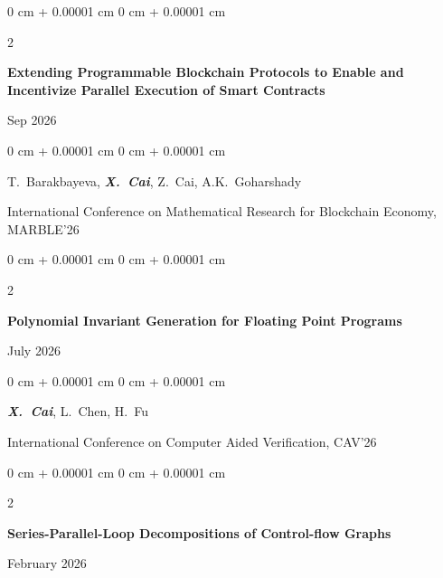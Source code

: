 \documentclass[10pt, letterpaper]{article}
\newenvironment{onecolentry}{
    \begin{adjustwidth}{
        0 cm + 0.00001 cm
    }{
        0 cm + 0.00001 cm
    }
}{
    \end{adjustwidth}
} %
\newenvironment{twocolentry}[2][]{
    \onecolentry
    \def\secondColumn{#2}
    \setcolumnwidth{\fill, 4.5 cm}
    \begin{paracol}{2}
}{
    \switchcolumn \raggedleft \secondColumn
    \end{paracol}
    \endonecolentry
} %
\begin{document}
        \begin{samepage}
                \vspace{0.2 cm}

                 \begin{twocolentry}{
                Sep 2026
            }
                \textbf{Extending Programmable Blockchain Protocols to Enable and Incentivize Parallel Execution of Smart Contracts}
            \end{twocolentry}

            \vspace{0.10 cm}
            
            \begin{onecolentry}
            \mbox{T. Barakbayeva},
                \mbox{\textbf{\textit{X. Cai}}}, 
                \mbox{Z. Cai},
                \mbox{A.K. Goharshady}
                \vspace{0.10 cm}

        International Conference on
Mathematical Research for Blockchain Economy, MARBLE'26
        \end{onecolentry}
                                \vspace{0.2 cm}


        
             \begin{twocolentry}{
                July 2026
            }
                \textbf{Polynomial Invariant Generation
for Floating Point Programs}
            \end{twocolentry}

            \vspace{0.10 cm}
            
            \begin{onecolentry}
                \mbox{\textbf{\textit{X. Cai}}}, 
                \mbox{L. Chen},
                \mbox{H. Fu}
                \vspace{0.10 cm}

        International Conference on Computer Aided Verification, CAV'26
        \end{onecolentry}
                                \vspace{0.2 cm}

        \begin{twocolentry}{
                February 2026
            }
                \textbf{Series-Parallel-Loop Decompositions of Control-flow Graphs
}
            \end{twocolentry}


\end{samepage}
\end{document}
